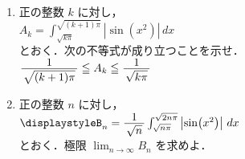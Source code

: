 ﻿\documentclass[../../../uem_tok_q.tex]{subfiles}
\begin{document}
    \begin{enumerate}
        \item 正の整数 $k$ に対し，\\
            \hspace{3\zw}%
            $\displaystyle%
                A_k = \int_{\sqrt{k\pi}}^{\sqrt{(k+1)\pi}}\left|\sin(x^2)\right| \, dx%
            $\\
            とおく．次の不等式が成り立つことを示せ．\\
            \hspace{3\zw}%
            $\displaystyle%
                \myfraca{1}{\sqrt{(k+1)\pi}}\leqq A_k\leqq \myfraca{1}{\sqrt{k\pi}}%
            $
        \item 正の整数 $n$ に対し，\\
            \hspace{3\zw}%
            $\displaystyle%
                B_n = \myfraca{1}{\sqrt{n}}\int_{\sqrt{n\pi}}^{\sqrt{2n\pi}}%
                    \left|\sin(x^2)\right| \, dx%
            $\\
            とおく．極限 $\displaystyle\lim_{n\to\infty}B_n$ を求めよ．
    \end{enumerate}
\end{document}
